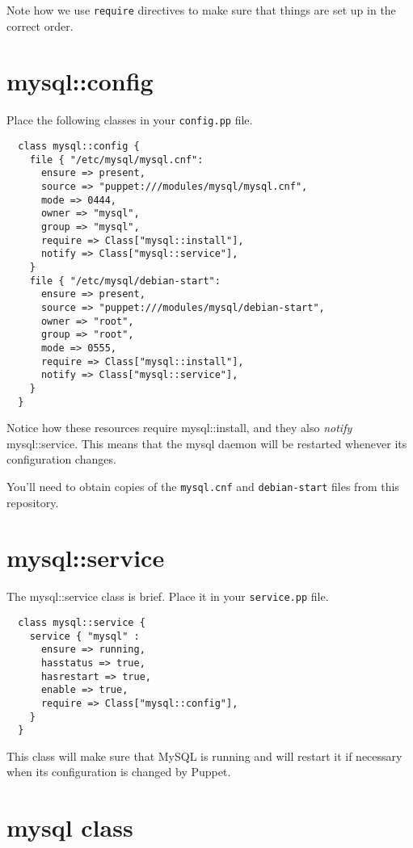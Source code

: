 \documentclass{article}   	%
\begin{document}
Note how we use \texttt{require} directives to make sure that things are set up in the correct order.

\newpage

\section{mysql::config}
Place the following classes in your \texttt{config.pp} file.

\begin{verbatim}
  class mysql::config {
    file { "/etc/mysql/mysql.cnf":
      ensure => present,
      source => "puppet:///modules/mysql/mysql.cnf",
      mode => 0444,
      owner => "mysql",
      group => "mysql",
      require => Class["mysql::install"],
      notify => Class["mysql::service"],
    }
    file { "/etc/mysql/debian-start":
      ensure => present,
      source => "puppet:///modules/mysql/debian-start",
      owner => "root",
      group => "root",
      mode => 0555,
      require => Class["mysql::install"],
      notify => Class["mysql::service"],
    }
  }
\end{verbatim}

Notice how these resources require mysql::install, and they also \emph{notify} mysql::service.  This means that the mysql daemon will be restarted whenever its configuration changes.

You'll need to obtain copies of the \texttt{mysql.cnf} and \texttt{debian-start} files from this repository.

\section{mysql::service}
The mysql::service class is brief.  Place it in your \texttt{service.pp} file.

\begin{verbatim}
  class mysql::service {
    service { "mysql" :
      ensure => running,
      hasstatus => true,
      hasrestart => true,
      enable => true,
      require => Class["mysql::config"],
    }
  }
\end{verbatim}

This class will make sure that MySQL is running and will restart it if necessary when its configuration is changed by Puppet.

\section{mysql class}
\end{document}

